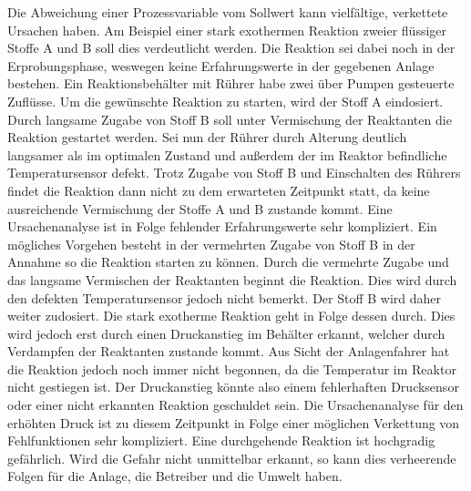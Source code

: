 Die Abweichung einer Prozessvariable vom Sollwert kann vielf\"altige, verkettete Ursachen haben. Am Beispiel einer stark exothermen Reaktion zweier fl\"ussiger Stoffe A und B soll dies verdeutlicht werden. Die Reaktion sei dabei noch in der Erprobungsphase, weswegen keine Erfahrungswerte in der gegebenen Anlage bestehen. \newline
Ein Reaktionsbeh\"alter mit R\"uhrer habe zwei \"uber Pumpen gesteuerte Zufl\"usse. Um die gew\"unschte Reaktion zu starten, wird der Stoff A eindosiert. Durch langsame Zugabe von Stoff B soll unter Vermischung der Reaktanten die Reaktion gestartet werden. Sei nun der R\"uhrer durch Alterung deutlich langsamer als im optimalen Zustand und au\ss{}erdem der im Reaktor befindliche Temperatursensor defekt. Trotz Zugabe von Stoff B und Einschalten des R\"uhrers findet die Reaktion dann nicht zu dem erwarteten Zeitpunkt statt, da keine ausreichende Vermischung der Stoffe A und B zustande kommt. Eine Ursachenanalyse ist in Folge fehlender Erfahrungswerte sehr kompliziert. Ein m\"ogliches Vorgehen besteht in der vermehrten Zugabe von Stoff B in der Annahme so die Reaktion starten zu k\"onnen. Durch die vermehrte Zugabe und das langsame Vermischen der Reaktanten beginnt die Reaktion. Dies wird durch den defekten Temperatursensor jedoch nicht bemerkt. Der Stoff B wird daher weiter zudosiert. Die stark exotherme Reaktion geht in Folge dessen durch. Dies wird jedoch erst durch einen Druckanstieg im Beh\"alter erkannt, welcher durch Verdampfen der Reaktanten zustande kommt. Aus Sicht der Anlagenfahrer hat die Reaktion jedoch noch immer nicht begonnen, da die Temperatur im Reaktor nicht gestiegen ist. Der Druckanstieg k\"onnte also einem fehlerhaften Drucksensor oder einer nicht erkannten Reaktion geschuldet sein. Die Ursachenanalyse f\"ur den erh\"ohten Druck ist zu diesem Zeitpunkt in Folge einer m\"oglichen Verkettung von Fehlfunktionen sehr kompliziert. Eine durchgehende Reaktion ist hochgradig gef\"ahrlich. Wird die Gefahr nicht unmittelbar erkannt, so kann dies verheerende Folgen f\"ur die Anlage, die Betreiber und die Umwelt haben.

